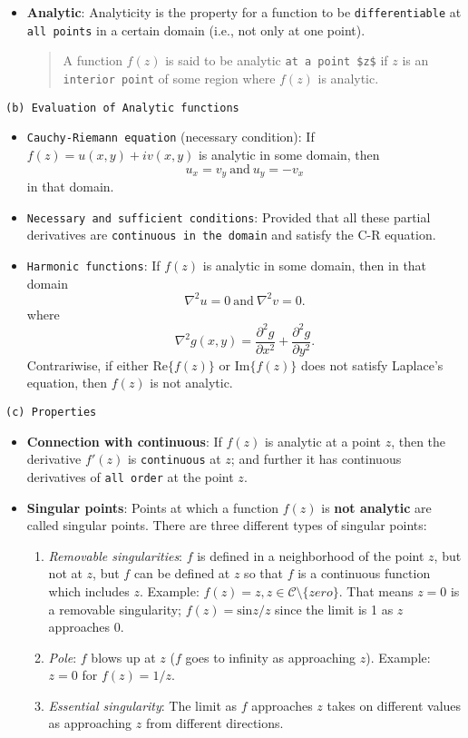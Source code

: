\begin{itemize}
\item \textbf{Analytic}: Analyticity is the property for a function to be \verb|differentiable| at \verb|all points| in a certain domain (i.e., not only at one point).
\begin{quote}
A function $f(z)$ is said to be analytic \verb|at a point $z$| if $z$ is an \verb|interior point| of some region where $f(z)$ is analytic.
\end{quote}
\end{itemize}
\verb|(b) Evaluation of Analytic functions|
\begin{itemize}
\item \verb|Cauchy-Riemann equation| (necessary condition): If $f(z) = u(x,y) + iv(x,y)$ is analytic in some domain, then 
$$
u_x = v_y\ \mathrm{and}\ u_y = -v_x
$$ in that domain. 
\item \verb|Necessary and sufficient conditions|: Provided that all these partial derivatives are \verb|continuous in the domain| and satisfy the C-R equation.
\item \verb|Harmonic functions|: If $f(z)$ is analytic in some domain, then in that domain
$$
\nabla^2u = 0\ \mathrm{and}\ \nabla^2v = 0.
$$ where
$$
\nabla^2 g(x,y) = \frac{\partial^2 g}{\partial x^2} + \frac{\partial^2 g}{\partial y^2}.
$$ Contrariwise, if either $\mathrm{Re}\{f(z)\}$ or $\mathrm{Im}\{f(z)\}$ does not satisfy Laplace's equation, then $f(z)$ is not analytic.
\end{itemize}
\verb|(c) Properties|
\begin{itemize}
\item \textbf{Connection with continuous}: If $f(z)$ is analytic at a point $z$, then the derivative $f'(z)$ is \verb|continuous| at $z$; and further it has continuous derivatives of \verb|all order| at the point $z$.
\item \textbf{Singular points}: Points at which a function $f(z)$ is \textbf{not analytic} are called singular points. There are three different types of singular points:
\begin{enumerate}
\item \textit{Removable singularities}: $f$ is defined in a neighborhood of the point $z$, but not at $z$, but $f$ can be defined at $z$ so that $f$ is a continuous function which includes $z$. Example: $f(z) = z, z \in \mathcal{C} \setminus \{zero\}$. That means $z=0$ is a removable singularity; $f(z) = \mathrm{sin} z/z$ since the limit is 1 as $z$ approaches 0.
\item \textit{Pole}: $f$ blows up at $z$ ($f$ goes to infinity as approaching $z$). Example: $z=0$ for $f(z) = 1/z$.
\item \textit{Essential singularity}: The limit as $f$ approaches $z$ takes on different values as approaching $z$ from different directions. 
\end{enumerate}
\end{itemize}
